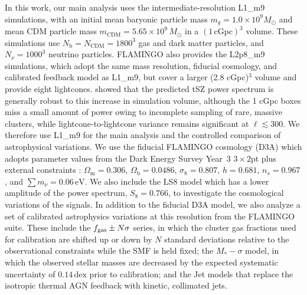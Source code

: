 \documentclass[aps,prd,twocolumn,superscriptaddress,nofootinbib,floatfix]{revtex4-2}
\begin{document}
In this work, our main analysis uses the intermediate-resolution L1\_m9 simulations, with an initial mean baryonic particle mass $m_g=1.0 \times10^9 M_\odot$ and mean CDM particle mass $m_{\mathrm{CDM}}=5.65\times10^{9}\,M_\odot$ in a $(1\,\mathrm{cGpc})^3$ volume. These simulations use $N_{\mathrm{b}}=N_{\mathrm{CDM}}=1800^{3}$ gas and dark matter particles, and $N_\nu=1000^{3}$ neutrino particles. FLAMINGO also provides the L2p8\_m9 simulations, which adopt the same mass resolution, fiducial cosmology, and calibrated feedback model as L1\_m9, but cover a larger (2.8 cGpc)$^3$ volume and provide eight lightcones. \citet{McCarthy:2023ism} showed that the predicted tSZ power spectrum is generally robust to this increase in simulation volume, although the 1 cGpc boxes miss a small amount of power owing to incomplete sampling of rare, massive clusters, while lightcone-to-lightcone variance remains significant at $\ell\lesssim300$. We therefore use L1\_m9 for the main analysis and the controlled comparison of astrophysical variations. We use the fiducial FLAMINGO cosmology (D3A) which adopts parameter values from the
Dark Energy Survey Year~3 \citep{Abbott2022} $3\times2$pt plus external constraints
\citep{Schaye2023}:
$\Omega_{\mathrm{m}}=0.306$, $\Omega_{\mathrm{b}}=0.0486$,
$\sigma_8=0.807$, $h=0.681$, $n_s=0.967$, and $\sum m_\nu=0.06\,\mathrm{eV}$. We also include the LS8 model which has a lower amplitude of the power spectrum, $S_8=0.766$, to investigate the cosmological variations of the signals. In addition to the fiducial D3A model, we also analyze a set of calibrated astrophysics variations at this resolution from the FLAMINGO suite. These include the \(f_{\rm gas}\pm N\sigma\) series, in which the cluster gas fractions used for calibration are shifted up or down by $N$ standard deviations relative to the observational constraints while the SMF is held fixed; the \(M_*-\sigma\) model, in which the observed stellar masses are decreased by the expected systematic uncertainty of \(0.14\,\mathrm{dex}\) prior to calibration; and the Jet models that replace the isotropic thermal AGN feedback with kinetic, collimated jets.

\end{document}
